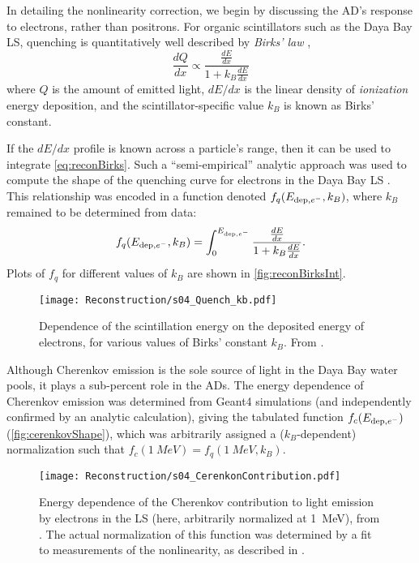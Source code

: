 \documentclass[../thesis.tex]{subfiles}
\begin{document}
In detailing the nonlinearity correction, we begin by discussing the AD's response to electrons, rather than positrons. For organic scintillators such as the Daya Bay LS, quenching is quantitatively well described by \emph{Birks' law} \cite{Birks_1951},
\begin{equation}
  \frac{dQ}{dx} \propto \frac{\frac{dE}{dx}}{1 + k_B \frac{dE}{dx}}
  \label{eq:reconBirks}
\end{equation}
where $Q$ is the amount of emitted light, $dE/dx$ is the linear density of \emph{ionization} energy deposition, and the scintillator-specific value $k_B$ is known as Birks' constant.

If the $dE/dx$ profile is known across a particle's range, then it can be used to integrate \autoref{eq:reconBirks}. Such a ``semi-empirical'' analytic approach was used to compute the shape of the quenching curve for electrons in the Daya Bay LS \cite{NonlinearityPaper}. This relationship was encoded in a function denoted $f_q(E_{\mathrm{dep},e^-}, k_B)$, where $k_B$ remained to be determined from data:
\begin{equation}
  f_q(E_{\mathrm{dep},e^-},k_B) = \int_0^{E_{\mathrm{dep},e^-}} \frac{\frac{dE}{dx}}{1 + k_B \frac{dE}{dx}}.
  \label{eq:reconBirksInt}
\end{equation}
Plots of $f_q$ for different values of $k_B$ are shown in \autoref{fig:reconBirksInt}.

\begin{figure}[h]
  \texttt{[image: Reconstruction/s04\_Quench\_kb.pdf]}
  \caption{Dependence of the scintillation energy on the deposited energy of electrons, for various values of Birks' constant $k_B$. From \cite{NonlinearityPaper}.}
  \label{fig:reconBirksInt}
\end{figure}

Although Cherenkov emission is the sole source of light in the Daya Bay water pools, it plays a sub-percent role in the ADs. The energy dependence of Cherenkov emission was determined from Geant4 simulations (and independently confirmed by an analytic calculation), giving the tabulated function $f_c(E_{\mathrm{dep},e^-})$ (\autoref{fig:cerenkovShape}), which was arbitrarily assigned a ($k_B$-dependent) normalization such that $f_c(\SI{1}{MeV}) = f_q(\SI{1}{MeV}, k_B)$. 

\begin{figure}[h]
  \texttt{[image: Reconstruction/s04\_CerenkonContribution.pdf]}
  \caption{Energy dependence of the Cherenkov contribution to light emission by electrons in the LS (here, arbitrarily normalized at 1~MeV), from \cite{NonlinearityPaper}. The actual normalization of this function was determined by a fit to measurements of the nonlinearity, as described in \cite{NonlinearityPaper}.}
  \label{fig:cerenkovShape}
\end{figure}
\end{document}
